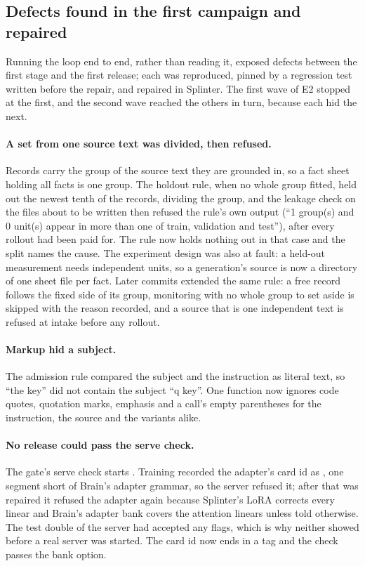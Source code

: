 \subsection{Defects found in the first campaign and repaired}\label{sec:defects}

Running the loop end to end, rather than reading it, exposed defects between the first
stage and the first release; each was reproduced, pinned by a regression test written
before the repair, and repaired in Splinter. The first wave of E2 stopped at the first,
and the second wave reached the others in turn, because each hid the next.

\paragraph{A set from one source text was divided, then refused.} Records carry the group
of the source text they are grounded in, so a fact sheet holding all facts is one group.
The holdout rule, when no whole group fitted, held out the newest tenth of the records,
dividing the group, and the leakage check on the files about to be written then refused the
rule's own output (``1 group(s) and 0 unit(s) appear in more than one of train, validation
and test''), after every rollout had been paid for. The rule now holds nothing out in that
case and the split names the cause. The experiment design was also at fault: a held-out
measurement needs independent units, so a generation's source is now a directory of one
sheet file per fact. Later commits extended the same rule: a free record follows the
fixed side of its group, monitoring with no whole group to set aside is skipped with the
reason recorded, and a source that is one independent text is refused at intake before any
rollout.

\paragraph{Markup hid a subject.} The admission rule compared the subject and the instruction
as literal text, so ``the  key'' did not contain the subject ``q key''. One function
now ignores code quotes, quotation marks, emphasis and a call's empty parentheses for the
instruction, the source and the variants alike.

\paragraph{No release could pass the serve check.} The gate's serve check starts
. Training recorded the adapter's card id as
, one segment short of Brain's adapter grammar, so the server
refused it; after that was repaired it refused the adapter again because Splinter's LoRA
corrects every linear and Brain's adapter bank covers the attention linears unless told
otherwise. The test double of the server had accepted any flags, which is why neither showed
before a real server was started. The card id now ends in a tag and the check passes the
bank option.

